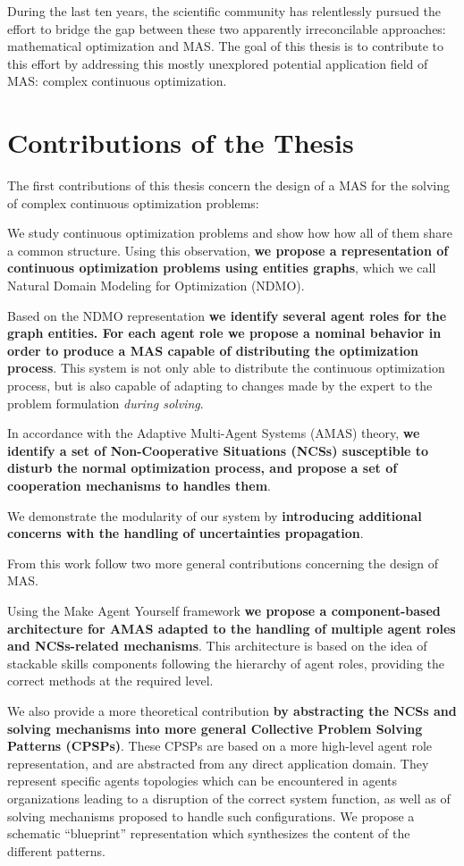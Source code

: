 \pagebreak
During the last ten years, the scientific community has relentlessly pursued the effort to bridge the gap between these two apparently irreconcilable approaches: mathematical optimization and MAS. The goal of this thesis is to contribute to this effort by addressing this mostly unexplored potential application field of MAS: complex continuous optimization.

\section*{Contributions of the Thesis}

The first contributions of this thesis concern the design of a MAS for the solving of complex continuous optimization problems:

We study continuous optimization problems and show how how all of them share a common structure. Using this observation, \textbf{we propose a representation of continuous optimization problems using entities graphs}, which we call Natural Domain Modeling for Optimization (NDMO).

Based on the NDMO representation \textbf{we identify several agent roles for the graph entities. For each agent role we propose a nominal behavior in order to produce a MAS capable of distributing the optimization process}. This system is not only able to distribute the continuous optimization process, but is also capable of adapting to changes made by the expert to the problem formulation \emph{during solving}.

In accordance with the Adaptive Multi-Agent Systems (AMAS) theory, \textbf{we identify a set of Non-Cooperative Situations (NCSs) susceptible to disturb the normal optimization process, and propose a set of cooperation mechanisms to handles them}.

We demonstrate the modularity of our system by \textbf{introducing additional concerns with the handling of uncertainties propagation}.

From this work follow two more general contributions concerning the design of MAS.

Using the Make Agent Yourself framework \textbf{we propose a component-based architecture for AMAS adapted to the handling of multiple agent roles and NCSs-related mechanisms}. This architecture is based on the idea of stackable skills components following the hierarchy of agent roles, providing the correct methods at the required level.

We also provide a more theoretical contribution \textbf{by abstracting the NCSs and solving mechanisms into more general Collective Problem Solving Patterns (CPSPs)}. These CPSPs are based on a more high-level agent role representation, and are abstracted from any direct application domain. They represent specific agents topologies which can be encountered in agents organizations leading to a disruption of the correct system function, as well as of solving mechanisms proposed to handle such configurations. We propose a schematic \enquote{blueprint} representation which synthesizes the content of the different patterns.

